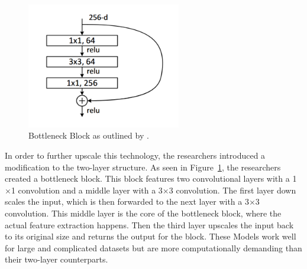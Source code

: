 \begin{figure}[ht]
    \centering
    \includegraphics[width=0.6\textwidth]{figures/BottleNeckBlock.png}
    \caption{Bottleneck Block as outlined by \citeauthor{he2015deep}.}\label{fig:bottleneckBlock}
\end{figure}

\label{resnet152}
In order to further upscale this technology, the researchers introduced a modification to the two-layer structure. As seen in Figure~\ref{fig:bottleneckBlock}, the researchers created a bottleneck block. This block features two convolutional layers with a 1$\times$1 convolution and a middle layer with a  3$\times$3 convolution. The first layer down scales the input, which is then forwarded to the next layer with a 3$\times$3 convolution. This middle layer is the core of the bottleneck block, where the actual feature extraction happens. Then the third layer upscales the input back to its original size and returns the output for the block. These Models work well for large and complicated datasets but are more computationally demanding than their two-layer counterparts. 